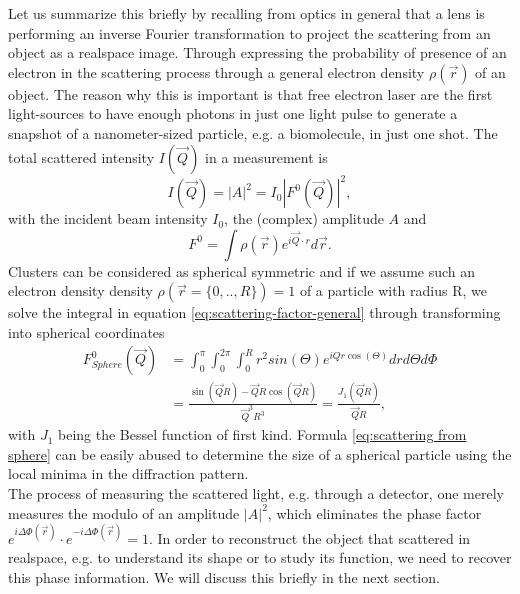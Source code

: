 Let us summarize this briefly by recalling from optics in general that a lens is performing an inverse Fourier transformation to project the scattering from an object as a realspace image. Through expressing the probability of presence of an electron in the scattering process through a general electron density $\rho\left(\vec{r}\right)$ of an object. The reason why this is important is that free electron laser are the first light-sources to have enough photons in just one light pulse to generate a snapshot of a nanometer-sized particle, e.g. a biomolecule, in just one shot. The total scattered intensity $I\left(\vec{Q}\right)$ in a measurement is
\begin{equation}
I\left(\vec{Q}\right)=\left|A\right|^{2}=I_{0}\left|F^{0}\left(\vec{Q}\right)\right|^{2},
\label{eq:scattered-intensity}
\end{equation}
with the incident beam intensity $I_{0}$, the (complex) amplitude $A$ and
\begin{equation}
F^{0}=\int \rho\left(\vec{r}\right) e^{i \vec{Q}\cdot r}d\vec{r}.
\label{eq:scattering-factor-general}
\end{equation}
Clusters can be considered as spherical symmetric and if we assume such an electron density density $\rho\left(\vec{r}=\{0,..,R\}\right)=1$ of a particle with radius R, we solve the integral in equation \eqref{eq:scattering-factor-general} through transforming into spherical coordinates
\begin{align}
F_{Sphere}^{0}\left(\vec{Q}\right) &= \int_{0}^{\pi}\int_{0}^{2\pi}\int_{0}^{R} r^{2}  sin\left(\Theta\right) e^{i Q r \cos\left(\Theta\right)} dr d\Theta d\Phi\\
&=\frac{\sin\left(\vec{Q} R\right)-\vec{Q} R\cos\left(\vec{Q} R\right)}{\vec{Q}^{3} R^{3}}=\frac{J_{1}\left(\vec{Q}R\right)}{\vec{Q}R},
\label{eq:scattering from sphere}
\end{align}
with $J_{1}$ being the Bessel function of first kind. Formula \eqref{eq:scattering from sphere} can be easily abused to determine the size of a spherical particle using the local minima in the diffraction pattern.\\
The process of measuring the scattered light, e.g. through a detector, one merely measures the modulo of an amplitude $\left|A\right|^{2}$, which eliminates the phase factor $e^{i\Delta\Phi\left(\vec{r}\right)}\cdot e^{-i\Delta\Phi\left(\vec{r}\right)}=1$. In order to reconstruct the object that scattered in realspace, e.g. to understand its shape or to study its function, we need to recover this phase information. We will discuss this briefly in the next section.
%
%
